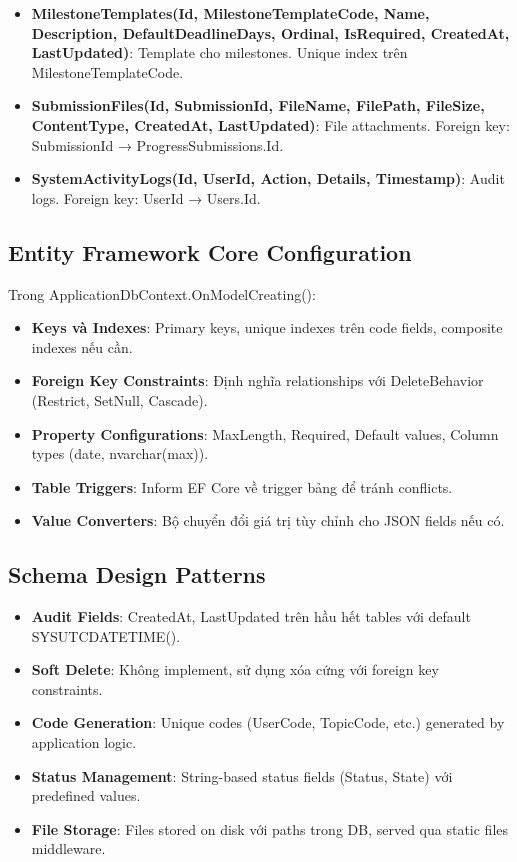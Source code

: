 \documentclass[conference,a4paper]{IEEEtran}
\begin{document}
\begin{itemize}
  \item \textbf{MilestoneTemplates(Id, MilestoneTemplateCode, Name, Description, DefaultDeadlineDays, Ordinal, IsRequired, CreatedAt, LastUpdated)}: Template cho milestones. Unique index trên MilestoneTemplateCode.
  
  \item \textbf{SubmissionFiles(Id, SubmissionId, FileName, FilePath, FileSize, ContentType, CreatedAt, LastUpdated)}: File attachments. Foreign key: SubmissionId → ProgressSubmissions.Id.
  
  \item \textbf{SystemActivityLogs(Id, UserId, Action, Details, Timestamp)}: Audit logs. Foreign key: UserId → Users.Id.
\end{itemize}

\subsection{Entity Framework Core Configuration}
Trong ApplicationDbContext.OnModelCreating():
\begin{itemize}
  \item \textbf{Keys và Indexes}: Primary keys, unique indexes trên code fields, composite indexes nếu cần.
  \item \textbf{Foreign Key Constraints}: Định nghĩa relationships với DeleteBehavior (Restrict, SetNull, Cascade).
  \item \textbf{Property Configurations}: MaxLength, Required, Default values, Column types (date, nvarchar(max)).
  \item \textbf{Table Triggers}: Inform EF Core về trigger bảng để tránh conflicts.
  \item \textbf{Value Converters}: Bộ chuyển đổi giá trị tùy chỉnh cho JSON fields nếu có.
\end{itemize}

\subsection{Schema Design Patterns}
\begin{itemize}
  \item \textbf{Audit Fields}: CreatedAt, LastUpdated trên hầu hết tables với default SYSUTCDATETIME().
  \item \textbf{Soft Delete}: Không implement, sử dụng xóa cứng với foreign key constraints.
  \item \textbf{Code Generation}: Unique codes (UserCode, TopicCode, etc.) generated by application logic.
  \item \textbf{Status Management}: String-based status fields (Status, State) với predefined values.
  \item \textbf{File Storage}: Files stored on disk với paths trong DB, served qua static files middleware.
\end{itemize}
\end{document}
